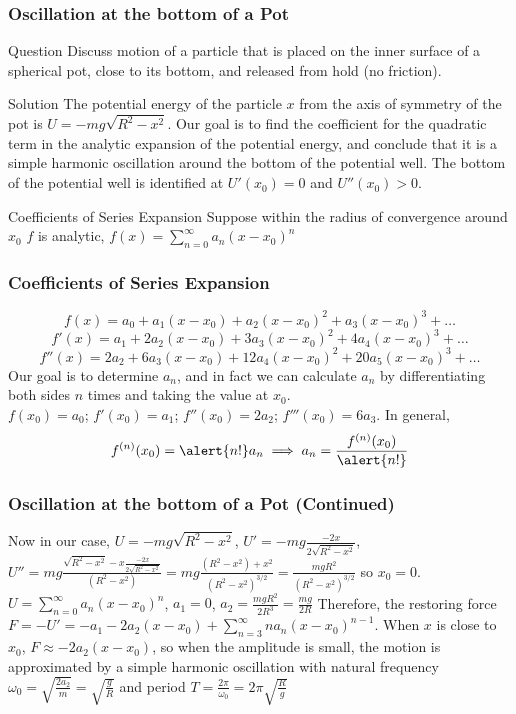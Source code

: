 \begin{frame}
\frametitle{Oscillation at the bottom of a Pot}
\begin{block}{Question}
Discuss motion of a particle that is placed on the inner surface of a spherical pot, close to its bottom, and released from hold (no friction).
\end{block}
\begin{block}{Solution}
The potential energy of the particle $x$ from the axis of symmetry of the pot is $U=-mg\sqrt{R^2-x^2}$. Our goal is to find the coefficient for the quadratic term in the \alert{analytic expansion} of the \alert{potential energy}, and conclude that it is a \alert{simple harmonic oscillation} around the bottom of the potential well. The bottom of the \alert{potential well} is identified at $U'(x_0)=0$ and $U''(x_0)>0$.
\end{block}
\begin{block}{Coefficients of Series Expansion}
Suppose within the \alert{radius of convergence} around $x_0$ $f$ is analytic, $f(x)=\sum_{n=0}^{\infty} a_n (x-x_0)^n$
\end{block}
\end{frame}
\begin{frame}
\frametitle{Coefficients of Series Expansion}
\[f(x)=a_0+a_1(x-x_0)+a_2(x-x_0)^2+a_3(x-x_0)^3+\dots\]
\[f'(x)=a_1+2a_2(x-x_0)+3a_3(x-x_0)^2+4a_4(x-x_0)^3+\dots\]
\[f''(x)=2a_2+6a_3(x-x_0)+12a_4(x-x_0)^2+20a_5(x-x_0)^3+\dots\]
Our goal is to determine $a_n$, and in fact we can calculate $a_n$ by \alert{differentiating} both sides $n$ times and \alert{taking the value} at $x_0$.\\
$f(x_0)=a_0$; $f'(x_0)=a_1$; $f''(x_0)=2a_2$; $f'''(x_0)=6a_3$. In general, \[f^{(n)}(x_0)=\alert{n!}a_n\implies a_n=\frac{f^{(n)}(x_0)}{\alert{n!}}\]
\end{frame}
\begin{frame}
\frametitle{Oscillation at the bottom of a Pot (Continued)}
Now in our case, $U=-mg\sqrt{R^2-x^2}$, $U'=-mg\frac{-2x}{2\sqrt{R^2-x^2}}$, $U''=mg\frac{\sqrt{R^2-x^2}-x\frac{-2x}{2\sqrt{R^2-x^2}}}{(R^2-x^2)}=mg\frac{(R^2-x^2)+x^2}{(R^2-x^2)^{3/2}}=\frac{mgR^2}{(R^2-x^2)^{3/2}}$ so $x_0=0$.
$U=\sum_{n=0}^{\infty}a_n(x-x_0)^n$, $a_1=0$, $a_2=\frac{mgR^2}{2R^3}=\frac{mg}{2R}$
Therefore, the \alert{restoring force} $F=-U'=-a_1-2a_2(x-x_0)+\sum_{n=3}^{\infty}na_n(x-x_0)^{n-1}$. When $x$ is close to $x_0$, $F\approx -2a_2(x-x_0)$, so when the \alert{amplitude} is small, the motion is approximated by a simple harmonic oscillation with \alert{natural frequency} $\omega_0=\sqrt{\frac{2a_2}{m}}=\sqrt{\frac{g}{R}}$ and \alert{period} $T=\frac{2\pi}{\omega_0}=2\pi\sqrt{\frac{R}{g}}$
\end{frame}

